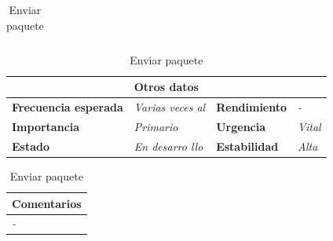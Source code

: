 \documentclass[12pt,spanish]{article}
\begin{document}
\begin{table}[H]
\begin{tabular}{|m{5pt}|m{7.33cm}|m{5pt}|m{7.33cm}|}
	\end{tabular}
	
	\vspace{0.5cm}
	
	\begin{tabular}{|m{3.75cm}|m{3.75cm}|m{3.75cm}|m{3.8cm}|}
		\hline
		\multicolumn{4}{|c|}{\textbf{Otros datos}} \\
		\hline
		\textbf{Frecuencia esperada} & \textit{Varias veces al} & \textbf{Rendimiento} & \textit{-} \\
		\hline
		\textbf{Importancia} & \textit{Primario} & \textbf{Urgencia} & \textit{Vital} \\
		\hline
		\textbf{Estado} & \textit{En desarro
		llo} & \textbf{Estabilidad} & \textit{Alta} \\
		\hline
	\end{tabular}
	
	\vspace{1cm}
	
	\begin{tabular}{|m{16.2cm}|}
		\hline
		\textbf{Comentarios} \\
		\hline
		\textit{-} \\
		\hline
	\end{tabular}
	
	\caption{Enviar paquete}
	
\end{table}
\end{document}
